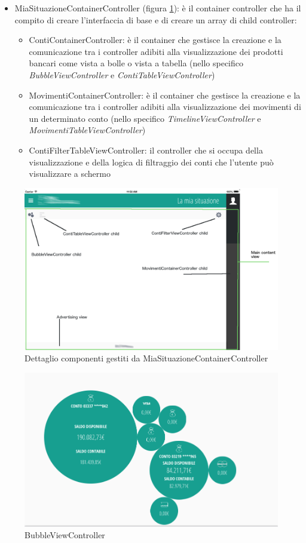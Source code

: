 \begin{itemize}
 \item MiaSituazioneContainerController (figura \ref{fig:miasituazione}): è il container controller che ha il compito di creare l'interfaccia di base e di creare un array di child controller:
 \begin{itemize}
  \item ContiContainerController: è il container che gestisce la creazione e la comunicazione tra i controller adibiti alla visualizzazione dei prodotti bancari come vista a bolle o vista a tabella (nello specifico \emph{BubbleViewController} e \emph{ContiTableViewController})
  \item MovimentiContainerController: è il container che gestisce la creazione e la comunicazione tra i controller adibiti alla visualizzazione dei movimenti di un determinato conto (nello specifico \emph{TimelineViewController} e \emph{MovimentiTableViewController})
  \item ContiFilterTableViewController: il controller che si occupa della visualizzazione e della logica di filtraggio dei conti che l'utente può visualizzare a schermo
 \end{itemize}
\end{itemize}
\begin{figure}[!htbp]
\centering
\includegraphics[scale=0.35]{dettagli/miasituazione.png}
\caption{Dettaglio componenti gestiti da MiaSituazioneContainerController}
\label{fig:miasituazione}
\end{figure}
\begin{figure}[!htbp]
\centering
\includegraphics[scale=0.35]{dettagli/bubble.png}
\caption{BubbleViewController}
\end{figure}
